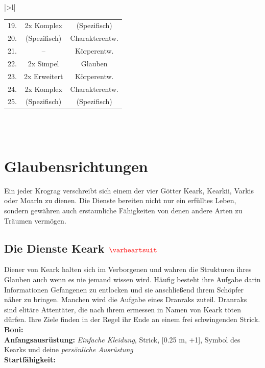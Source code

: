 \begin{table}[h!]
\begin{tabular}{|>{}l|}
\begin{tabular}{c|c|c}
            \rowcolor{myred} 19. & 2x Komplex & (Spezifisch)\\
            \rowcolor{mybrown} 20. & (Spezifisch) & Charakterentw.\\
            \rowcolor{myred} 21. & -- & Körperentw.\\
            \rowcolor{mybrown} 22. & 2x Simpel & Glauben\\
            \rowcolor{myred} 23. & 2x Erweitert & Körperentw.\\
            \rowcolor{mybrown} 24. & 2x Komplex & Charakterentw.\\
            \rowcolor{myred} 25. & (Spezifisch) & (Spezifisch) \\
        \end{tabular}\\
        \\
        \btrule{1pt}
    \end{tabular}
\end{table}

 

\section*{Glaubensrichtungen}
Ein jeder Krograg verschreibt sich einem der vier Götter Keark, Kearkii, Varkis oder Moarln zu dienen. Die Dienste bereiten nicht nur ein erfülltes Leben, sondern gewähren auch erstaunliche Fähigkeiten von denen andere Arten zu Träumen vermögen.    

\subsection*{Die Dienste Keark $\Herz{}$}
Diener von Keark halten sich im Verborgenen und wahren die Strukturen ihres Glauben auch wenn es nie jemand wissen wird. Häufig besteht ihre Aufgabe darin Informationen Gefangenen zu entlocken und sie anschließend ihrem Schöpfer näher zu bringen. Manchen wird die Aufgabe eines Dranraks zuteil. Dranraks sind elitäre Attentäter, die nach ihrem ermessen in Namen von Keark töten dürfen. Ihre Ziele finden in der Regel ihr Ende an einem frei schwingenden Strick. \\
\textbf{Boni:} \\
\textbf{Anfangsausrüstung:} \textit{Einfache Kleidung}, Strick, \textit{} [0.25 m, +1], Symbol des Kearks und deine \textit{persönliche Ausrüstung}  \\
\textbf{Startfähigkeit:}  \\

